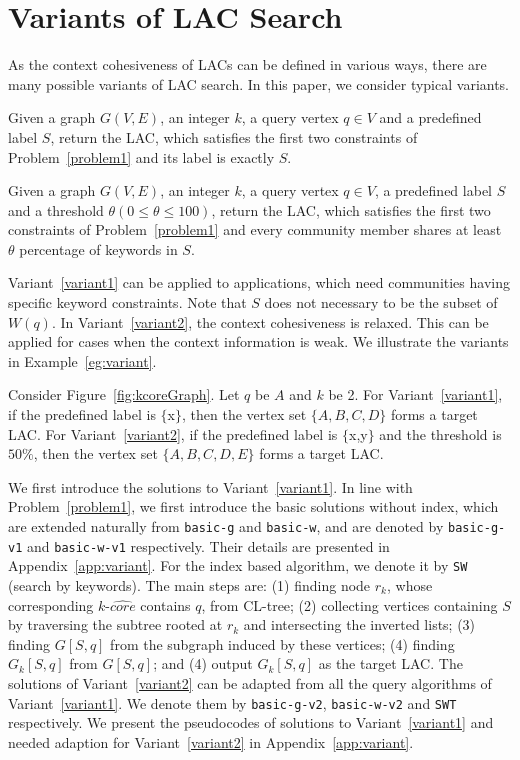 \section{Variants of LAC Search}
\label{variant}
As the context cohesiveness of LACs can be defined in various ways,
there are many possible variants of LAC search.
In this paper, we consider  typical variants.

\begin{variant}
\label{variant1}
Given a graph $G(V,E)$, an integer $k$, a query vertex $q\in V$ and a predefined label $S$,
return the LAC, which satisfies the first two constraints of Problem~\ref{problem1}
and its label is exactly $S$.
\end{variant}


\begin{variant}
\label{variant2}
Given a graph $G(V,E)$, an integer $k$, a query vertex $q\in V$,
a predefined label $S$ and a threshold $\theta (0\leq \theta\leq 100)$,
return the LAC, which satisfies the first two constraints of Problem~\ref{problem1}
and every community member shares at least $\theta$ percentage of keywords in $S$.
\end{variant}

Variant~\ref{variant1} can be applied to applications,
which need communities having specific keyword constraints.
Note that $S$ does not necessary to be the subset of $W(q)$.
In Variant~\ref{variant2}, the context cohesiveness is relaxed.
This can be applied for cases when the context information is weak.
We illustrate the variants in Example~\ref{eg:variant}.

\begin{example}
\label{eg:variant}
Consider Figure~\ref{fig:kcoreGraph}. Let $q$ be $A$ and $k$ be 2.
For Variant~\ref{variant1}, if the predefined label is $\{$x$\}$,
then the vertex set $\{A,B,C,D\}$ forms a target LAC.
For Variant~\ref{variant2}, if the predefined label is $\{$x,y$\}$
and the threshold is $50\%$,
then the vertex set $\{A,B,C,D,E\}$ forms a target LAC.
\end{example}

We first introduce the solutions to Variant~\ref{variant1}.
In line with Problem~\ref{problem1}, we first introduce the basic solutions without index,
which are extended naturally from {\tt basic-g} and {\tt basic-w},
and are denoted by {\tt basic-g-v1} and {\tt basic-w-v1} respectively.
Their details are presented in Appendix~\ref{app:variant}.
For the index based algorithm, we denote it by {\tt SW} (search by keywords).
The main steps are:
(1) finding node $r_k$, whose corresponding $k$-$\widehat {core}$ contains $q$, from CL-tree;
(2) collecting vertices containing $S$ by traversing the subtree rooted at $r_k$ and intersecting the inverted lists;
(3) finding $G[S,q]$ from the subgraph induced by these vertices;
(4) finding $G_k[S,q]$ from $G[S,q]$;
and (4) output $G_k[S,q]$ as the target LAC.
The solutions of Variant~\ref{variant2} can be adapted from all the query algorithms of Variant~\ref{variant1}.
We denote them by {\tt basic-g-v2}, {\tt basic-w-v2} and {\tt SWT} respectively.
We present the pseudocodes of solutions to Variant~\ref{variant1}
and needed adaption for Variant~\ref{variant2} in Appendix~\ref{app:variant}.


